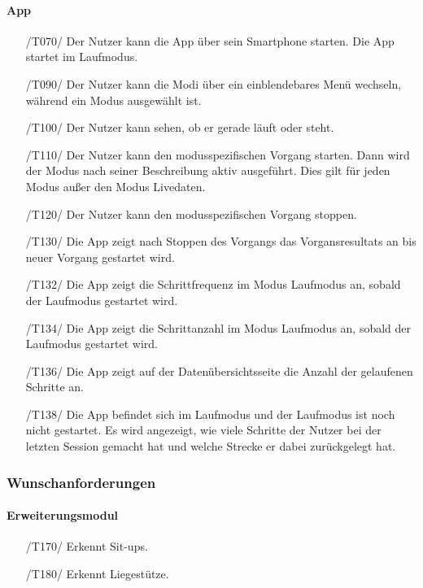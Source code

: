\documentclass[a4paper,12pt]{article}
\begin{document}
  \paragraph{App}
    \begin{itemize}
    \item[/T070/] Der Nutzer kann die App über sein Smartphone starten. Die App startet im Laufmodus.
    \item[/T090/] Der Nutzer kann die Modi über ein einblendebares Menü wechseln, während ein Modus ausgewählt ist.
    \item[/T100/] Der Nutzer kann sehen, ob er gerade \glqq läuft\grqq{} oder \glqq steht\grqq{}.
    \item[/T110/] Der Nutzer kann den modusspezifischen \Gls{Vorgang} starten. Dann wird der Modus nach seiner Beschreibung aktiv ausgeführt. Dies gilt für jeden Modus außer den Modus \glqq Livedaten\grqq.
    \item[/T120/] Der Nutzer kann den modusspezifischen \Gls{Vorgang} stoppen.
    \item[/T130/] Die App zeigt nach Stoppen des Vorgangs das Vorgansresultats an bis neuer \Gls{Vorgang} gestartet wird.
    \item[/T132/] Die App zeigt die \gls{Schrittfrequenz} im Modus \glqq{}Laufmodus\grqq{} an, sobald der Laufmodus gestartet wird.
    \item[/T134/] Die App zeigt die Schrittanzahl im Modus \glqq{}Laufmodus\grqq{} an, sobald der Laufmodus gestartet wird.
    \item[/T136/] Die App zeigt auf der Datenübersichtsseite die Anzahl der gelaufenen Schritte an.
    \item[/T138/] Die App befindet sich im Laufmodus und der Laufmodus ist noch nicht gestartet. Es wird angezeigt, wie viele Schritte der Nutzer bei der letzten Session gemacht hat und welche Strecke er dabei zurückgelegt hat.
  \end{itemize}

\subsubsection{Wunschanforderungen}
  \paragraph{Erweiterungsmodul}
    \begin{itemize}
    \item[/T170/] Erkennt Sit-ups. 
    \item[/T180/] Erkennt Liegestütze.
  \end{itemize}
\end{document}
